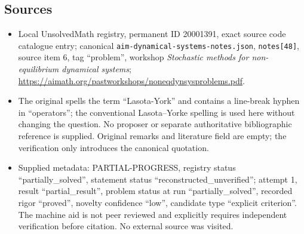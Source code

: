 \documentclass[11pt]{article}
\begin{document}
\subsection{Sources}
\begin{itemize}
\item Local UnsolvedMath registry, permanent ID 20001391, exact source code catalogue entry; canonical \texttt{aim-dynamical-systems-notes.json}, \texttt{notes[48]}, source item 6, tag ``problem'', workshop \emph{Stochastic methods for non-equilibrium dynamical systems}; \url{https://aimath.org/pastworkshops/noneqdynsysproblems.pdf}.
\item The original spells the term ``Lasota-York'' and contains a line-break hyphen in ``operators''; the conventional Lasota--Yorke spelling is used here without changing the question. No proposer or separate authoritative bibliographic reference is supplied. Original remarks and literature field are empty; the verification only introduces the canonical quotation.
\item Supplied metadata: PARTIAL-PROGRESS, registry status ``partially\_solved'', statement status ``reconstructed\_unverified''; attempt 1, result ``partial\_result'', problem status at run ``partially\_solved'', recorded rigor ``proved'', novelty confidence ``low'', candidate type ``explicit criterion''. The machine aid is not peer reviewed and explicitly requires independent verification before citation. No external source was visited.
\end{itemize}
\end{document}
